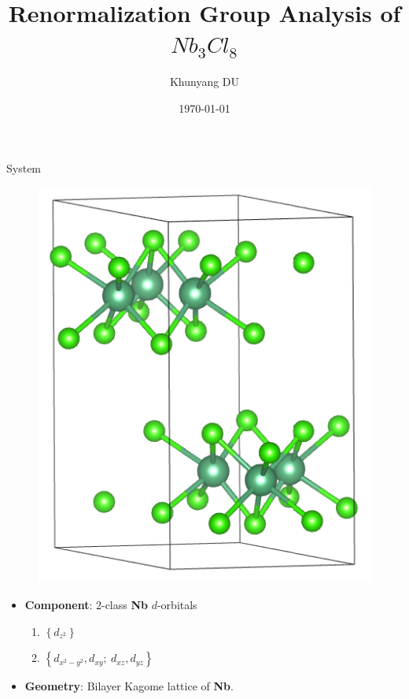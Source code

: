\documentclass{beamer}
\title{Renormalization Group Analysis of $Nb_3Cl_8$}
\author{Khunyang DU}
\institute{School of Physics, Beihang University (BUAA)}
\date{\today}
\begin{document}
\begin{frame}
	\titlepage
\end{frame}

\begin{frame}{System}
	\begin{multicols}{2}
		\begin{figure}[H]
		\includegraphics[width=0.8\linewidth]{figures/Nb3Cl8.png}
		\end{figure}
		\newpage
		\begin{itemize}
			\item \textbf{Component}: 2-class \textbf{Nb} $d$-orbitals
			\begin{enumerate}
				\item   $\left\{d_{z^2}\right\}$ 
				\item   $\left\{d_{x^2-y^2},d_{xy} ;\ d_{xz},d_{yz} \right\}$
			\end{enumerate}
			\item \textbf{Geometry}: Bilayer Kagome lattice of \textbf{Nb}.
		\end{itemize}
	\end{multicols}
\end{frame}
\end{document}

